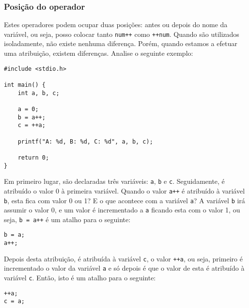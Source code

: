 \begin{mdframed}[backgroundcolor=cinzaclaro, linewidth=0pt]
\subsubsection{Posição do operador}

Estes operadores podem ocupar duas posições: antes ou depois do nome da variável, ou seja, posso colocar tanto \texttt{num++} como \texttt{++num}. Quando são utilizados isoladamente, não existe nenhuma diferença. Porém, quando estamos a efetuar uma atribuição, existem diferenças. Analise o seguinte exemplo:

\begin{lstlisting}
#include <stdio.h>  
   
int main() {     
    int a, b, c;  
   
    a = 0;  
    b = a++;  
    c = ++a;  
	   
    printf("A: %d, B: %d, C: %d", a, b, c);  
   
    return 0;  
}  
\end{lstlisting}

Em primeiro lugar, são declaradas três variáveis: \texttt{a}, \texttt{b} e \texttt{c}. Seguidamente, é atribuído o valor 0 à primeira variável. Quando o valor \texttt{a++} é atribuído à variável \texttt{b}, esta fica com valor 0 ou 1? E o que acontece com a variável \texttt{a}? A variável \texttt{b} irá assumir o valor 0, e um valor é incrementado a \texttt{a} ficando esta com o valor 1, ou seja, \texttt{b = a++} é um atalho para o seguinte:

\begin{lstlisting}
b = a;  
a++;  
\end{lstlisting}

Depois desta atribuição, é atribuída à variável \texttt{c}, o valor \texttt{++a}, ou seja, primeiro é incrementado o valor da variável \texttt{a} e só depois é que o valor de esta é atribuído à variável \texttt{c}. Então, isto é um atalho para o seguinte:

\begin{lstlisting}
++a;  
c = a;
\end{lstlisting}
\end{mdframed}